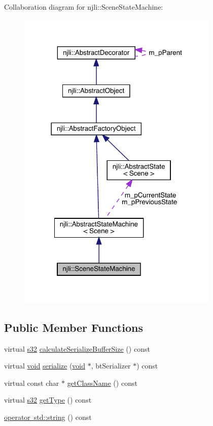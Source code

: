 Collaboration diagram for njli\+:\+:Scene\+State\+Machine\+:\nopagebreak
\begin{figure}[H]
\begin{center}
\leavevmode
\includegraphics[width=273pt]{classnjli_1_1_scene_state_machine__coll__graph}
\end{center}
\end{figure}
\subsection*{Public Member Functions}
\begin{DoxyCompactItemize}
\item 
virtual \mbox{\hyperlink{_util_8h_aa62c75d314a0d1f37f79c4b73b2292e2}{s32}} \mbox{\hyperlink{classnjli_1_1_scene_state_machine_a3bea7e481a04e8c938d92bb911072a7d}{calculate\+Serialize\+Buffer\+Size}} () const
\item 
virtual \mbox{\hyperlink{_thread_8h_af1e856da2e658414cb2456cb6f7ebc66}{void}} \mbox{\hyperlink{classnjli_1_1_scene_state_machine_aea5cd03074546b8ffccf52936ea67e72}{serialize}} (\mbox{\hyperlink{_thread_8h_af1e856da2e658414cb2456cb6f7ebc66}{void}} $\ast$, bt\+Serializer $\ast$) const
\item 
virtual const char $\ast$ \mbox{\hyperlink{classnjli_1_1_scene_state_machine_a5a3f221a1b765b690d2cfd45e8a5e574}{get\+Class\+Name}} () const
\item 
virtual \mbox{\hyperlink{_util_8h_aa62c75d314a0d1f37f79c4b73b2292e2}{s32}} \mbox{\hyperlink{classnjli_1_1_scene_state_machine_a26b4b620f64b21d9731c0114f2943cfa}{get\+Type}} () const
\item 
\mbox{\hyperlink{classnjli_1_1_scene_state_machine_aa3292255b28de515aa6bd2c5c8a9507c}{operator std\+::string}} () const
\end{DoxyCompactItemize}
